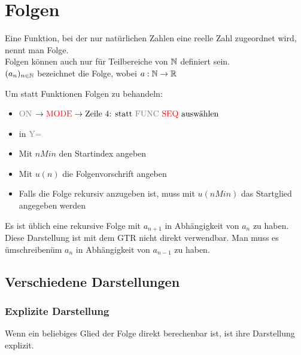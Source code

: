 \documentclass[main.tex]{subfiles}
\begin{document}
\chapter{Folgen}



\begin{Definition}
Eine Funktion, bei der nur natürlichen Zahlen eine reelle Zahl zugeordnet wird, nennt man Folge.\\
Folgen können auch nur für Teilbereiche von $\mathbb{N}$ definiert sein.\\
$(a_{n})_{n\in\mathbb{N}}$ bezeichnet die Folge, wobei $a:\mathbb{N}\rightarrow\mathbb{R}$
\end{Definition}

\begin{GTR-Tipp}
	Um statt Funktionen Folgen zu behandeln:
	\begin{itemize}
		\item\textcolor{gray}{ON} $\rightarrow \textcolor{red}{\text{MODE}} \rightarrow \text{Zeile 4: statt \textcolor{gray}{FUNC} \textcolor{red}{SEQ} auswählen}$
		\item in \textcolor{gray}{Y=}
		\item Mit $nMin$ den Startindex angeben
		\item Mit $u(n)$ die Folgenvorschrift angeben
		\item Falls die Folge rekursiv anzugeben ist, muss mit $u(nMin)$ das Startglied angegeben werden
	\end{itemize}
\end{GTR-Tipp}

\begin{Bemerkung}
Es ist üblich eine rekursive Folge mit $a_{n+1}$ in Abhängigkeit von $a_n$ zu haben. Diese Darstellung ist mit dem GTR nicht direkt verwendbar. Man muss es \"umschreiben\" um $a_n$ in Abhängigkeit von $a_{n-1}$ zu haben.
\end{Bemerkung}

		\section{Verschiedene Darstellungen}


	\subsection{Explizite Darstellung}

\begin{Definition}
Wenn ein beliebiges Glied der Folge direkt berechenbar ist, ist ihre Darstellung explizit.
\end{Definition}
\end{document}

